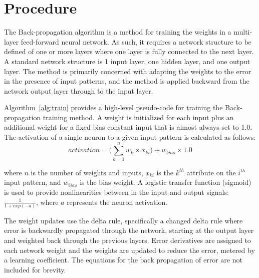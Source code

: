 \documentclass[a4paper, 11pt]{article}
\begin{document}
\section{Procedure}
\label{sec:procedure}
The Back-propagation algorithm is a method for training the weights in a multi-layer feed-forward neural network. As such, it requires a network structure to be defined of one or more layers where one layer is fully connected to the next layer. A standard network structure is 1 input layer, one hidden layer, and one output layer. The method is primarily concerned with adapting the weights to the error in the presence of input patterns, and the method is applied backward from the network output layer through to the input layer.

Algorithm~\ref{alg:train} provides a high-level pseudo-code for training the Back-propagation training method. A weight is initialized for each input plus an additional weight for a fixed bias constant input that is almost always set to 1.0. The activation of a single neuron to a given input pattern is calculated as follows:
\begin{equation}
	activation = \bigg(\sum_{k=1}^{n} w_{k} \times x_{ki}\bigg) + w_{bias} \times 1.0
\end{equation}

where $n$ is the number of weights and inputs, $x_{ki}$ is the $k^{th}$ attribute on the $i^{th}$ input pattern, and $w_{bias}$ is the bias weight. A logistic transfer function (sigmoid) is used to provide nonlinearities between in the input and output signals: $\frac{1}{1+exp(-a)}$, where $a$ represents the neuron activation. 

The weight updates use the delta rule, specifically a changed delta rule where error is backwardly propagated through the network, starting at the output layer and weighted back through the previous layers. Error derivatives are assigned to each network weight and the weights are updated to reduce the error, metered by a learning coefficient. The equations for the back propagation of error are not included for brevity.
\end{document}
